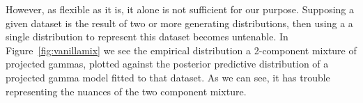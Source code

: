 However, as flexible as it is, it alone is not sufficient for our purpose.  Supposing
  a given dataset is the result of two or more generating distributions, then using a
  a single distribution to represent this dataset becomes untenable.  In Figure~\ref{fig:vanillamix}
  we see the empirical distribution a 2-component mixture of projected gammas, plotted
  against the posterior predictive distribution of a projected gamma model fitted to
  that dataset.  As we can see, it has trouble representing the nuances of the two
  component mixture.


